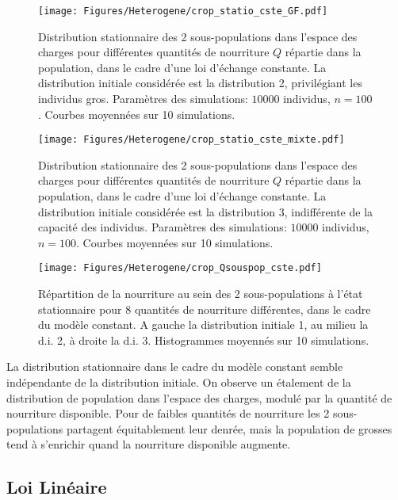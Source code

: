 \begin{figure}[h!]
\centering
\texttt{[image: Figures/Heterogene/crop\_statio\_cste\_GF.pdf]}
\caption{Distribution stationnaire des 2 sous-populations dans l'espace des charges pour différentes quantités de nourriture $Q$ répartie dans la population, dans le cadre d'une loi d'échange constante. La distribution initiale considérée est la distribution 2, privilégiant les individus gros. Paramètres des simulations: $10000$ individus, $n=100$. Courbes moyennées sur 10 simulations.}
\label{statio_cste_GF}
\end{figure}

\begin{figure}[h!]
\centering
\texttt{[image: Figures/Heterogene/crop\_statio\_cste\_mixte.pdf]}
\caption{Distribution stationnaire des 2 sous-populations dans l'espace des charges pour différentes quantités de nourriture $Q$ répartie dans la population, dans le cadre d'une loi d'échange constante. La distribution initiale considérée est la distribution 3, indifférente de la capacité des individus. Paramètres des simulations: $10000$ individus, $n=100$. Courbes moyennées sur 10 simulations.}
\label{statio_cste_mixte}
\end{figure}

\begin{figure}[h!]
\centering
\texttt{[image: Figures/Heterogene/crop\_Qsouspop\_cste.pdf]}
\caption{Répartition de la nourriture au sein des 2 sous-populations à l'état stationnaire pour 8 quantités de nourriture différentes, dans le cadre du modèle constant. A gauche la distribution initiale 1, au milieu la d.i. 2, à droite la d.i. 3. Histogrammes moyennés sur 10 simulations.}
\label{Qsouspop_cste}
\end{figure}


La distribution stationnaire dans le cadre du modèle constant semble indépendante de la distribution initiale. On observe un étalement de la distribution de population dans l'espace des charges, modulé par la quantité de nourriture disponible. Pour de faibles quantités de nourriture les 2 sous-populations partagent équitablement leur denrée, mais la population de grosses tend à s'enrichir quand la nourriture disponible augmente.

\clearpage

\subsection{Loi Linéaire}

